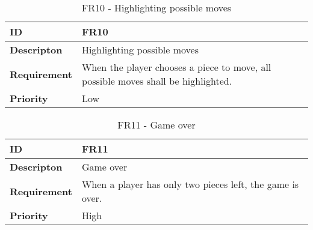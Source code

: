 \begin{table}[h!]
\begin{tabular}{ | p{90pt} | p{270pt}  |}
\hline
\bf ID &  FR10  \\ \hline
\bf Descripton & Highlighting possible moves \\ \hline 
\bf Requirement & When the player chooses a piece to move, all possible moves shall be highlighted.  \\ \hline
\bf Priority & Low \\ \hline

\end{tabular}

\caption{FR10 - Highlighting possible moves}

\end{table}


\begin{table}[h!]
\begin{tabular}{ | p{90pt} | p{270pt}  |}
\hline
\bf ID &  FR11  \\ \hline
\bf Descripton & Game over \\ \hline 
\bf Requirement & When a player has only two pieces left, the game is over.  \\ \hline
\bf Priority & High \\ \hline

\end{tabular}

\caption{FR11 - Game over}

\end{table}

\pagebreak



